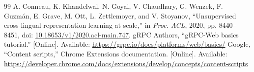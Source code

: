 \documentclass[12pt,a4paper]{article}
\newcommand{\doi}[1]{doi: \href{https://doi.org/#1}{#1}}
\begin{document}
\begin{thebibliography}{99}
 A. Conneau, K. Khandelwal, N. Goyal, V. Chaudhary, G. Wenzek, F. Guzmán, E. Grave, M. Ott, L. Zettlemoyer, and V. Stoyanov, ``Unsupervised cross-lingual representation learning at scale,'' in \emph{Proc. ACL}, 2020, pp. 8440--8451, \doi{10.18653/v1/2020.acl-main.747}.
 gRPC Authors, ``gRPC-Web basics tutorial.'' [Online]. Available: \url{https://grpc.io/docs/platforms/web/basics/}
 Google, ``Content scripts,'' Chrome Extensions documentation. [Online]. Available: \url{https://developer.chrome.com/docs/extensions/develop/concepts/content-scripts}
\end{thebibliography}
\end{document}
